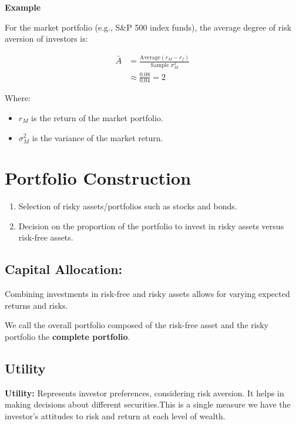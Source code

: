 \documentclass[
]{book}
\providecommand{\tightlist}{%
  \setlength{\itemsep}{0pt}\setlength{\parskip}{0pt}}
\begin{document}
\textbf{Example}

For the market portfolio (e.g., S\&P 500 index funds), the average
degree of risk aversion of investors is:

\[
\begin{aligned}
\bar{A} &= \frac{\text{Average}(r_M - r_f)}{\text{Sample } \sigma_M^2}\\
 &\approx \frac{0.08}{0.04} = 2
\end{aligned}
\]

Where:

\begin{itemize}
\tightlist
\item
  \(r_M\) is the return of the market portfolio.
\item
  \(\sigma_M^2\) is the variance of the market return.
\end{itemize}

\hypertarget{portfolio-construction}{%
\section{Portfolio Construction}\label{portfolio-construction}}

\begin{enumerate}
\def\labelenumi{\arabic{enumi}.}
\item
  Selection of risky assets/portfolios such as stocks and bonds.
\item
  Decision on the proportion of the portfolio to invest in risky assets
  versus risk-free assets.
\end{enumerate}

\hypertarget{capital-allocation}{%
\subsection{Capital Allocation:}\label{capital-allocation}}

Combining investments in risk-free and risky assets allows for varying
expected returns and risks.

We call the overall portfolio composed of the risk-free asset and the
risky portfolio the \textbf{complete portfolio}.

\hypertarget{utility}{%
\subsection{Utility}\label{utility}}

\textbf{Utility:} Represents investor preferences, considering risk
aversion. It helps in making decisions about different securities.This
is a single measure we have the investor's attitudes to risk and return
at each level of wealth.
\end{document}
